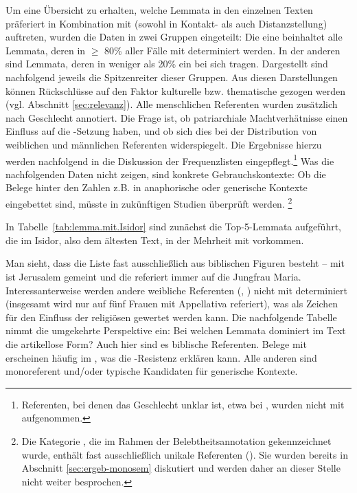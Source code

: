 Um eine Übersicht zu erhalten, welche Lemmata  in den einzelnen Texten präferiert in Kombination mit  (sowohl in Kontakt- als auch Distanzstellung) auftreten, wurden die Daten in zwei Gruppen eingeteilt: Die eine beinhaltet alle  Lemmata, deren  in $\geq$ 80\% aller Fälle  mit  determiniert werden. In der anderen sind  Lemmata, deren  in weniger als 20\%  ein  bei sich tragen. Dargestellt sind nachfolgend jeweils die Spitzenreiter dieser Gruppen. Aus diesen Darstellungen können Rückschlüsse auf den Faktor kulturelle bzw. thematische  gezogen werden (vgl. Abschnitt \ref{sec:relevanz}). Alle menschlichen Referenten wurden zusätzlich nach Geschlecht annotiert. Die Frage ist, ob patriarchiale Machtverhätnisse  einen Einfluss auf die -Setzung haben, und ob sich dies bei der Distribution von weiblichen und männlichen Referenten widerspiegelt. Die Ergebnisse hierzu werden nachfolgend in die Diskussion der Frequenzlisten eingepflegt.\footnote{Referenten, bei denen das Geschlecht unklar ist, etwa bei , wurden nicht mit aufgenommen.} Was die nachfolgenden Daten nicht zeigen, sind konkrete Gebrauchskontexte: Ob die Belege hinter den Zahlen z.B. in anaphorische  oder generische  Kontexte eingebettet sind, müsste in zukünftigen Studien überprüft werden. \footnote{Die Kategorie , die im Rahmen der Belebtheitsannotation   gekennzeichnet wurde, enthält fast ausschließlich unikale Referenten (). Sie wurden bereits in Abschnitt \ref{sec:ergeb-monosem} diskutiert und werden daher an dieser Stelle nicht weiter besprochen.} 

In Tabelle~\ref {tab:lemma.mit.Isidor} sind zunächst die Top-5-Lemmata   aufgeführt, die im Isidor, also dem ältesten Text, in der Mehrheit mit  vorkommen. 


Man sieht, dass die Liste fast ausschließlich aus biblischen Figuren besteht -- mit  ist Jerusalem gemeint und die  referiert immer auf die Jungfrau Maria. Interessanterweise werden andere weibliche Referenten (, ) nicht mit  determiniert (insgesamt wird nur auf fünf Frauen mit Appellativa  referiert), was als Zeichen für den Einfluss der religiösen  gewertet werden kann. 
Die nachfolgende Tabelle nimmt die umgekehrte Perspektive ein: Bei welchen Lemmata  dominiert im Text die artikellose Form? Auch hier sind es biblische Referenten. Belege mit  erscheinen häufig im , was die -Resistenz erklären kann. Alle anderen sind monoreferent und/oder typische Kandidaten für generische  Kontexte.

